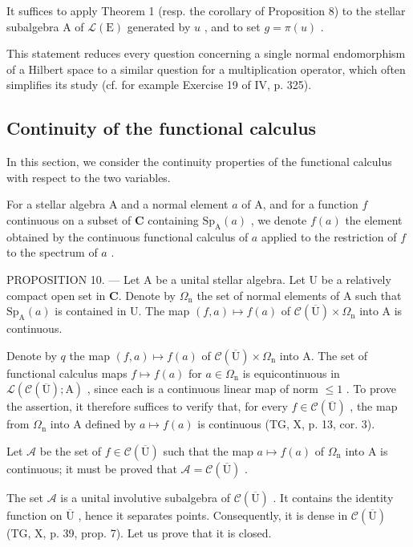 It suffices to apply Theorem 1 (resp. the corollary of Proposition 8) to the stellar subalgebra A of \(\mathcal{L}(\mathrm{E})\) generated by \(u\) , and to set \(g = \pi(u)\) .

This statement reduces every question concerning a single normal endomorphism of a Hilbert space to a similar question for a multiplication operator, which often simplifies its study (cf. for example Exercise 19 of IV, p. 325).

\subsection{Continuity of the functional calculus}

In this section, we consider the continuity properties of the functional calculus with respect to the two variables.

For a stellar algebra A and a normal element \(a\) of A, and for a function \(f\) continuous on a subset of \(\mathbf{C}\) containing \(\mathrm{Sp}_{\mathrm{A}}(a)\) , we denote \(f(a)\) the element obtained by the continuous functional calculus of \(a\) applied to the restriction of \(f\) to the spectrum of \(a\) .

PROPOSITION 10. --- Let A be a unital stellar algebra. Let U be a relatively compact open set in \(\mathbf{C}\). Denote by \(\Omega_{\mathrm{n}}\) the set of normal elements of A such that \(\mathrm{Sp}_{\mathrm{A}}(a)\) is contained in U. The map \((f,a)\mapsto f(a)\) of \(\mathcal{C}(\overline{\mathrm{U}})\times \Omega_{\mathrm{n}}\) into A is continuous.

Denote by \(q\) the map \((f, a) \mapsto f(a)\) of \(\mathcal{C}(\overline{\mathrm{U}}) \times \Omega_{\mathrm{n}}\) into A. The set of functional calculus maps \(f \mapsto f(a)\) for \(a \in \Omega_{\mathrm{n}}\) is equicontinuous in \(\mathcal{L}(\mathcal{C}(\overline{\mathrm{U}}); \mathrm{A})\) , since each is a continuous linear map of norm \(\leqslant 1\) . To prove the assertion, it therefore suffices to verify that, for every \(f \in \mathcal{C}(\overline{\mathrm{U}})\) , the map from \(\Omega_{\mathrm{n}}\) into A defined by \(a \mapsto f(a)\) is continuous (TG, X, p. 13, cor. 3).

Let \(\mathcal{A}\) be the set of \(f\in\mathcal{C}(\overline{\mathrm{U}})\) such that the map \(a\mapsto f(a)\) of \(\Omega_{\mathrm{n}}\) into A is continuous; it must be proved that \(\mathcal{A}=\mathcal{C}(\overline{\mathrm{U}})\) .

The set \(\mathcal{A}\) is a unital involutive subalgebra of \(\mathcal{C}(\overline{\mathrm{U}})\) . It contains the identity function on \(\overline{\mathrm{U}}\) , hence it separates points. Consequently, it is dense in \(\mathcal{C}(\overline{\mathrm{U}})\) (TG, X, p. 39, prop. 7). Let us prove that it is closed.

